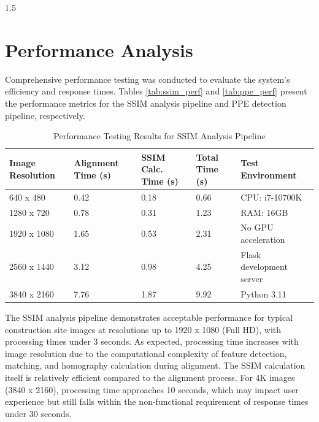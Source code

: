 \documentclass[12pt,a4paper]{report}
\begin{document}
\begin{spacing}{1.5}
    \section{Performance Analysis}
    Comprehensive performance testing was conducted to evaluate the system's efficiency and response times. Tables \ref{tab:ssim_perf} and \ref{tab:ppe_perf} present the performance metrics for the SSIM analysis pipeline and PPE detection pipeline, respectively.

    \begin{table}[H]
        \centering
        \caption{Performance Testing Results for SSIM Analysis Pipeline}
        \label{tab:ssim_perf2}
        \begin{tabular}{|p{3cm}|p{2.5cm}|p{2.5cm}|p{2.5cm}|p{3cm}|}
            \hline
            \textbf{Image Resolution} & \textbf{Alignment Time (s)} & \textbf{SSIM Calc. Time (s)} & \textbf{Total Time (s)} & \textbf{Test Environment} \\
            \hline
            640 x 480                 & 0.42                        & 0.18                         & 0.66                    & CPU: i7-10700K            \\
            \hline
            1280 x 720                & 0.78                        & 0.31                         & 1.23                    & RAM: 16GB                 \\
            \hline
            1920 x 1080               & 1.65                        & 0.53                         & 2.31                    & No GPU acceleration       \\
            \hline
            2560 x 1440               & 3.12                        & 0.98                         & 4.25                    & Flask development server  \\
            \hline
            3840 x 2160               & 7.76                        & 1.87                         & 9.92                    & Python 3.11               \\
            \hline
        \end{tabular}
    \end{table}

    The SSIM analysis pipeline demonstrates acceptable performance for typical construction site images at resolutions up to 1920 x 1080 (Full HD), with processing times under 3 seconds. As expected, processing time increases with image resolution due to the computational complexity of feature detection, matching, and homography calculation during alignment. The SSIM calculation itself is relatively efficient compared to the alignment process. For 4K images (3840 x 2160), processing time approaches 10 seconds, which may impact user experience but still falls within the non-functional requirement of response times under 30 seconds.


\end{spacing}
\end{document}
